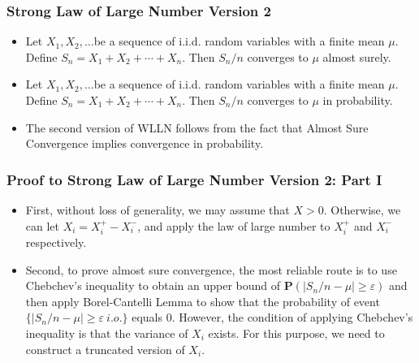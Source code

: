 \documentclass[handout]{beamer}
\newcommand{\BP}{\mathbf{P}}
\begin{document}
\frame
{
  \frametitle{Strong Law of Large Number Version 2}

   \begin{itemize}
   \item<1->[]   \begin{Theorem}[SLLN V2] Let $X_1, X_2,\ldots$be a sequence of i.i.d. random variables with a finite mean $\mu$. Define $S_n=X_1+X_2+\cdots +X_n$. Then $S_n/n$ converges to $\mu$ almost surely.
      
   \end{Theorem}
   
      \item<2->[]   \begin{Corollary} Let $X_1, X_2,\ldots$be a sequence of i.i.d. random variables with a finite mean $\mu$. Define $S_n=X_1+X_2+\cdots +X_n$. Then $S_n/n$ converges to $\mu$ in probability.
      
   \end{Corollary}
      
      
      \item<3->[] The second version of WLLN follows from the fact that Almost Sure Convergence implies convergence in probability. 
      
                 
                                      
\end{itemize}
}


\frame
{
  \frametitle{Proof to Strong Law of Large Number Version 2: Part I}

   \begin{itemize}
   \item<1-> First, without loss of generality, we may assume that $X>0$. Otherwise, we can let $X_i=X_i^+-X_i^-$, and apply the law of large number to $X_i^+$ and $X_i^-$ respectively. 
   
      \item<2->[-] Second, to prove almost sure convergence, the most reliable route is to use Chebchev's inequality to obtain an upper bound of $\BP( |S_n/n-\mu|\geq \varepsilon)$ and then apply  Borel-Cantelli Lemma to show that the probability of event $\{|S_n/n-\mu|\geq \varepsilon\ i.o.\}$ equals 0. However, the condition of applying Chebchev's inequality is that the variance of $X_i$ exists. For this purpose, we need to construct a truncated version of $X_i$. 
                                            
\end{itemize}
}
\end{document}
